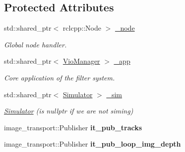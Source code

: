 \subsection*{Protected Attributes}
\begin{DoxyCompactItemize}
\item 
\mbox{\label{classov__msckf_1_1ROS2Visualizer_aad482388407009f1bdacd886d9a7d74c}} 
std\+::shared\+\_\+ptr$<$ rclcpp\+::\+Node $>$ \hyperlink{classov__msckf_1_1ROS2Visualizer_aad482388407009f1bdacd886d9a7d74c}{\+\_\+node}
\begin{DoxyCompactList}\small\item\em Global node handler. \end{DoxyCompactList}\item 
\mbox{\label{classov__msckf_1_1ROS2Visualizer_a1586e2d19475d770bb83405d04218941}} 
std\+::shared\+\_\+ptr$<$ \hyperlink{classov__msckf_1_1VioManager}{Vio\+Manager} $>$ \hyperlink{classov__msckf_1_1ROS2Visualizer_a1586e2d19475d770bb83405d04218941}{\+\_\+app}
\begin{DoxyCompactList}\small\item\em Core application of the filter system. \end{DoxyCompactList}\item 
\mbox{\label{classov__msckf_1_1ROS2Visualizer_af343bba4d35f89ebe2d28943bc82cced}} 
std\+::shared\+\_\+ptr$<$ \hyperlink{classov__msckf_1_1Simulator}{Simulator} $>$ \hyperlink{classov__msckf_1_1ROS2Visualizer_af343bba4d35f89ebe2d28943bc82cced}{\+\_\+sim}
\begin{DoxyCompactList}\small\item\em \hyperlink{classov__msckf_1_1Simulator}{Simulator} (is nullptr if we are not sim\textquotesingle{}ing) \end{DoxyCompactList}\item 
\mbox{\label{classov__msckf_1_1ROS2Visualizer_a023a013d608f5c90b44f4fb87e7ce4d8}} 
image\+\_\+transport\+::\+Publisher {\bfseries it\+\_\+pub\+\_\+tracks}
\item 
\mbox{\label{classov__msckf_1_1ROS2Visualizer_a73e2203bc1860cd53ecdb172318692e6}} 
image\+\_\+transport\+::\+Publisher {\bfseries it\+\_\+pub\+\_\+loop\+\_\+img\+\_\+depth}

\end{DoxyCompactItemize}
